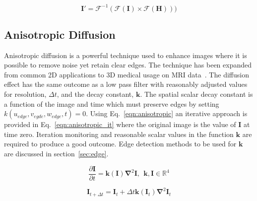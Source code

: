 \documentclass[journal]{IEEEtran}
\begin{document}

\begin{equation}
	\textbf{I}' = \mathcal{F}^{-1}(\mathcal{F}(\textbf{I})\times\mathcal{F}(\textbf{H})))		%
	\label{eqn:same} 
\end{equation}


\subsection{Anisotropic Diffusion}
Anisotropic diffusion is a powerful technique used to enhance images where it is possible to remove noise yet retain clear edges.
The technique has been expanded from common 2D applications to 3D medical usage on MRI data~\cite{nakh11three}.
The diffusion effect has the same outcome as a low pass filter with reasonably adjusted values for resolution, $\Delta t$, and the decay constant, $\mathbf{k}$.
The spatial scalar decay constant is a function of the image and time which must preserve edges by setting $k(u_{edge},v_{egde},w_{edge},t) = 0$.
Using Eq.~\eqref{eqn:anisotropic} an iterative approach is provided in Eq.~\eqref{eqn:anisotropic_it} where the original image is the value of $\mathbf{I}$ at time zero.
Iteration monitoring and reasonable scalar values in the function $\mathbf{k}$ are required to produce a good outcome.
Edge detection methods to be used for $\mathbf{k}$ are discussed in section~\ref{sec:edge}.

\begin{equation}
	\frac{\partial \mathbf{I}}{\partial t} = \mathbf{k(\mathbf{I})} \mathbf{\nabla}^2 \mathbf{I},\:\:\mathbf{k},\mathbf{I} \in \mathbb{R}^4
	\label{eqn:anisotropic} 
\end{equation}

\begin{equation}
	\mathbf{I}_{t + \Delta t} = \mathbf{I}_t + \Delta t\mathbf{k}(\mathbf{I}_t)\mathbf{\nabla}^2\mathbf{I}_t
	\label{eqn:anisotropic_it} 
\end{equation}
\end{document}
